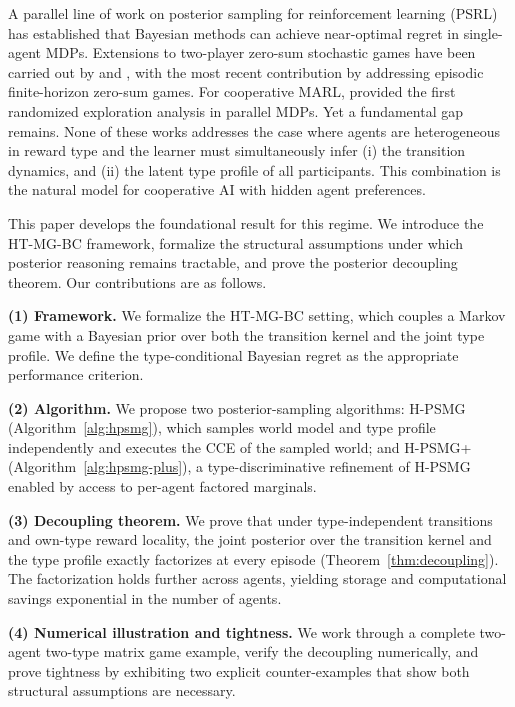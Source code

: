\documentclass{article}
\def\textsuperscript#1{#1}%
\begin{document}
A parallel line of work on posterior sampling for reinforcement learning (PSRL) \citep{strens2000bayesian,osband2013more,agrawal2017optimistic,osband2017posterior} has established that Bayesian methods can achieve near-optimal regret in single-agent MDPs. Extensions to two-player zero-sum stochastic games have been carried out by \citet{jafarnia2021learning} and \citet{xiong2022self}, with the most recent contribution by \citet{yueh2026bayesian} addressing episodic finite-horizon zero-sum games. For cooperative MARL, \citet{hsu2024randomized} provided the first randomized exploration analysis in parallel MDPs. Yet a fundamental gap remains. None of these works addresses the case where agents are heterogeneous in reward type and the learner must simultaneously infer (i) the transition dynamics, and (ii) the latent type profile of all participants. This combination is the natural model for cooperative AI with hidden agent preferences.

This paper develops the foundational result for this regime. We introduce the HT-MG-BC framework, formalize the structural assumptions under which posterior reasoning remains tractable, and prove the posterior decoupling theorem. Our contributions are as follows.

\textbf{(1) Framework.} We formalize the HT-MG-BC setting, which couples a Markov game with a Bayesian prior over both the transition kernel and the joint type profile. We define the type-conditional Bayesian regret as the appropriate performance criterion.

\textbf{(2) Algorithm.} We propose two posterior-sampling algorithms: H-PSMG (Algorithm~\ref{alg:hpsmg}), which samples world model and type profile independently and executes the CCE of the sampled world; and H-PSMG\textsuperscript{+} (Algorithm~\ref{alg:hpsmg-plus}), a type-discriminative refinement of H-PSMG enabled by access to per-agent factored marginals.

\textbf{(3) Decoupling theorem.} We prove that under type-independent transitions and own-type reward locality, the joint posterior over the transition kernel and the type profile exactly factorizes at every episode (Theorem~\ref{thm:decoupling}). The factorization holds further across agents, yielding storage and computational savings exponential in the number of agents.

\textbf{(4) Numerical illustration and tightness.} We work through a complete two-agent two-type matrix game example, verify the decoupling numerically, and prove tightness by exhibiting two explicit counter-examples that show both structural assumptions are necessary.
\end{document}
